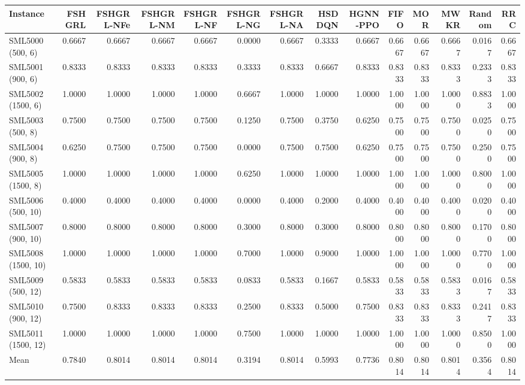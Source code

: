 \begin{tabular}{lrrrrrrrrrrrrr}
\toprule
Instance & FSHGRL & FSHGRL-NFe & FSHGRL-NM & FSHGRL-NF & FSHGRL-NG & FSHGRL-NA & HSDDQN & HGNN-PPO & FIFO & MOR & MWKR & Random & RRC \\
\midrule
SML5000 (500, 6) & 0.6667 & 0.6667 & 0.6667 & 0.6667 & 0.0000 & 0.6667 & 0.3333 & 0.6667 & 0.6667 & 0.6667 & 0.6667 & 0.0167 & 0.6667 \\
SML5001 (900, 6) & 0.8333 & 0.8333 & 0.8333 & 0.8333 & 0.3333 & 0.8333 & 0.6667 & 0.8333 & 0.8333 & 0.8333 & 0.8333 & 0.2333 & 0.8333 \\
SML5002 (1500, 6) & 1.0000 & 1.0000 & 1.0000 & 1.0000 & 0.6667 & 1.0000 & 1.0000 & 1.0000 & 1.0000 & 1.0000 & 1.0000 & 0.8833 & 1.0000 \\
SML5003 (500, 8) & 0.7500 & 0.7500 & 0.7500 & 0.7500 & 0.1250 & 0.7500 & 0.3750 & 0.6250 & 0.7500 & 0.7500 & 0.7500 & 0.0250 & 0.7500 \\
SML5004 (900, 8) & 0.6250 & 0.7500 & 0.7500 & 0.7500 & 0.0000 & 0.7500 & 0.7500 & 0.6250 & 0.7500 & 0.7500 & 0.7500 & 0.2500 & 0.7500 \\
SML5005 (1500, 8) & 1.0000 & 1.0000 & 1.0000 & 1.0000 & 0.6250 & 1.0000 & 1.0000 & 1.0000 & 1.0000 & 1.0000 & 1.0000 & 0.8000 & 1.0000 \\
SML5006 (500, 10) & 0.4000 & 0.4000 & 0.4000 & 0.4000 & 0.0000 & 0.4000 & 0.2000 & 0.4000 & 0.4000 & 0.4000 & 0.4000 & 0.0200 & 0.4000 \\
SML5007 (900, 10) & 0.8000 & 0.8000 & 0.8000 & 0.8000 & 0.3000 & 0.8000 & 0.3000 & 0.8000 & 0.8000 & 0.8000 & 0.8000 & 0.1700 & 0.8000 \\
SML5008 (1500, 10) & 1.0000 & 1.0000 & 1.0000 & 1.0000 & 0.7000 & 1.0000 & 0.9000 & 1.0000 & 1.0000 & 1.0000 & 1.0000 & 0.7700 & 1.0000 \\
SML5009 (500, 12) & 0.5833 & 0.5833 & 0.5833 & 0.5833 & 0.0833 & 0.5833 & 0.1667 & 0.5833 & 0.5833 & 0.5833 & 0.5833 & 0.0167 & 0.5833 \\
SML5010 (900, 12) & 0.7500 & 0.8333 & 0.8333 & 0.8333 & 0.2500 & 0.8333 & 0.5000 & 0.7500 & 0.8333 & 0.8333 & 0.8333 & 0.2417 & 0.8333 \\
SML5011 (1500, 12) & 1.0000 & 1.0000 & 1.0000 & 1.0000 & 0.7500 & 1.0000 & 1.0000 & 1.0000 & 1.0000 & 1.0000 & 1.0000 & 0.8500 & 1.0000 \\
Mean & 0.7840 & 0.8014 & 0.8014 & 0.8014 & 0.3194 & 0.8014 & 0.5993 & 0.7736 & 0.8014 & 0.8014 & 0.8014 & 0.3564 & 0.8014 \\
\bottomrule
\end{tabular}

